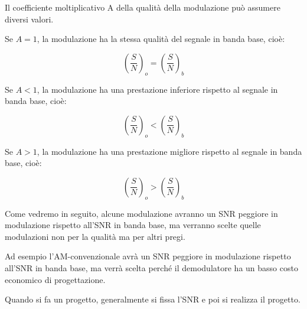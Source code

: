 Il coefficiente moltiplicativo A della qualità della modulazione può assumere diversi valori. \newline 

Se $A = 1$, la modulazione ha la stessa qualità del segnale in banda base, cioè: 

{
    \Large 
    \begin{equation}
       \left( \frac{S}{N} \right)_{o}
       = 
        \left( \frac{S}{N} \right)_{b} 
    \end{equation}
}

Se $A < 1$, la modulazione ha una prestazione inferiore rispetto al segnale in banda base, cioè: 

{
    \Large 
    \begin{equation}
        \left( \frac{S}{N} \right)_{o}
       < 
        \left( \frac{S}{N} \right)_{b} 
    \end{equation}
}

Se $A > 1$, la modulazione ha una prestazione migliore rispetto al segnale in banda base, cioè: 

{
    \Large 
    \begin{equation}
        \left( \frac{S}{N} \right)_{o}
       > 
    \left( \frac{S}{N} \right)_{b} 
    \end{equation}
}

\begin{tcolorbox}
    Come vedremo in seguito, alcune modulazione avranno un SNR peggiore in modulazione rispetto all'SNR in banda base, 
    ma verranno scelte quelle modulazioni non per la qualità ma per altri pregi. \newline 

    Ad esempio l'AM-convenzionale avrà un SNR peggiore in modulazione rispetto all'SNR in banda base, 
    ma verrà scelta perché il demodulatore ha un basso costo economico di progettazione. 
\end{tcolorbox}

Quando si fa un progetto, generalmente si fissa l'SNR e poi si realizza il progetto. \newline 


